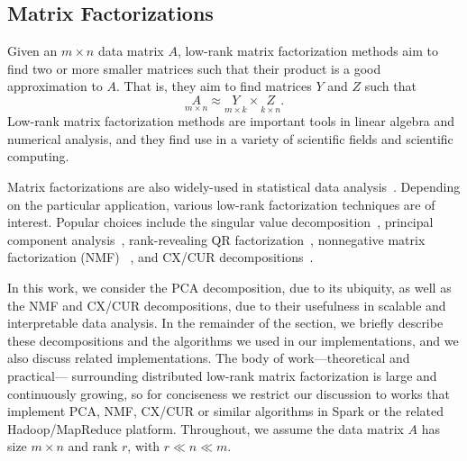 
\subsection{Matrix Factorizations}

Given an $m \times n$ data matrix $A$, low-rank matrix factorization methods aim to find two or more smaller matrices such that their product is a good approximation to $A$.
That is, they aim to find matrices $Y$ and $Z$ such that
\begin{equation*}
 \label{eqn:apprx}
    \underset{m\times n}{A} \approx \underset{m\times k}{Y} \times \underset{k\times n}{Z}. 
\end{equation*}
Low-rank matrix factorization methods are important tools in linear algebra and numerical analysis, and they find use in a variety of scientific fields and scientific computing.

Matrix factorizations are also widely-used in statistical data analysis~\cite{HMH00}.
Depending on the particular application, various low-rank factorization techniques are of interest. Popular choices include the singular value decomposition~\cite{GVL96}, principal component analysis~\cite{pcaBook}, rank-revealing QR factorization~\cite{GE96}, nonnegative matrix factorization (NMF) ~\cite{NMFalg}, and CX/CUR decompositions~\cite{CUR_PNAS}.

In this work, we consider the PCA decomposition, due to its ubiquity, as well as the NMF and CX/CUR decompositions, due to their usefulness in scalable and interpretable data analysis. In the remainder of the section, we briefly describe these decompositions and the algorithms we used in our implementations, and we also discuss related implementations. The body of work---theoretical and practical--- surrounding distributed low-rank matrix factorization is large and continuously growing, so for conciseness we restrict our discussion to works that implement PCA, NMF, CX/CUR or similar algorithms in Spark or the related Hadoop/MapReduce platform.
Throughout, we assume the data matrix $A$ has size $m \times n$ and rank $r$, with $r \ll n \ll m.$

